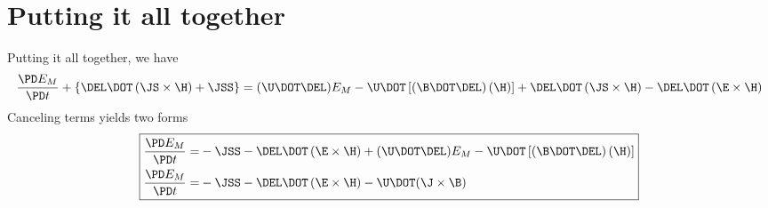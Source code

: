 \documentclass[11pt]{article}
\begin{document}
\section{Putting it all together}
Putting it all together, we have
\begin{equation}
	\frac{\PD E_M}{\PD t} + 
	\left\{ \DEL \DOT \left(\JS \times \H \right) + \JSS \right\} =
	(\U \DOT \DEL) E_M
	- \U \DOT \left[(\B \DOT \DEL) \left( \H \right) \right] 
	+ \DEL \DOT \left(\JS \times \H \right) 
	- \DEL \DOT \left(\E \times \H \right)
\end{equation}
Canceling terms yields two forms
\begin{equation}\boxed{\begin{aligned}
	\frac{\PD E_M}{\PD t} = &
	- \JSS
	- \DEL \DOT \left(\E \times \H \right)
	+ (\U \DOT \DEL) E_M
	- \U \DOT \left[(\B \DOT \DEL) \left( \H \right) \right]  \\
	\frac{\PD E_M}{\PD t} = &
	- \JSS
	- \DEL \DOT \left(\E \times \H \right)
	- \U \DOT (\J \times \B)
\end{aligned}}\end{equation}
\end{document}
